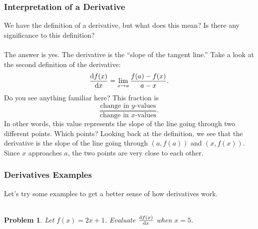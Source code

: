 \documentclass{article}
\newtheorem*{problem}{Problem}
\begin{document}
\subsubsection{Interpretation of a Derivative}
We have the definition of a derivative, but what does this mean? Is there any significance to this definition?
\\
\\
The answer is yes. The derivative is the ``slope of the tangent line.'' Take a look at the second definition of the derivative:
\[\diff{f(x)}{x}=\lim_{x\to a}\frac{f(a)-f(x)}{a-x}.\]
Do you see anything familiar here? This fraction is 
\[\frac{\text{change in $y$-values}}{\text{change in $x$-values}}.\]
In other words, this value represents the slope of the line going through two different points. Which points? Looking back at the definition, we see that the derivative is the slope of the line going through $(a,f(a))$ and $(x,f(x))$. Since $x$ approaches $a$, the two points are very close to each other.



\subsubsection{Derivatives Examples}
Let's try some examples to get a better sense of how derivatives work. 
\\
\\
\begin{problem}
Let $f(x)=2x+1$. Evaluate $\diff{f(x)}{x}$ when $x=5$.
\end{problem}
\end{document}
